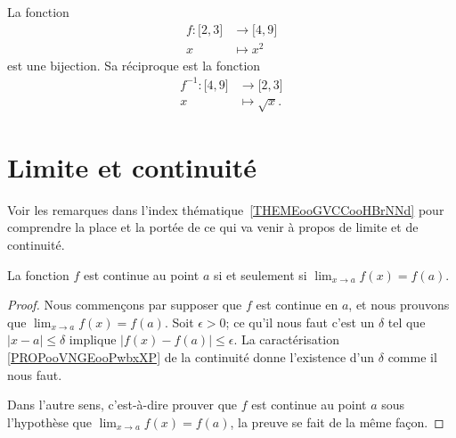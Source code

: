 \begin{example}
	La fonction
	\begin{equation}
		\begin{aligned}
			f\colon \mathopen[ 2 , 3 \mathclose] & \to \mathopen[ 4 , 9 \mathclose] \\
			x                                    & \mapsto x^2
		\end{aligned}
	\end{equation}
	est une bijection. Sa réciproque est la fonction
	\begin{equation}
		\begin{aligned}
			f^{-1}\colon \mathopen[ 4 , 9 \mathclose] & \to \mathopen[ 2 , 3 \mathclose] \\
			x                                         & \mapsto \sqrt{x}.
		\end{aligned}
	\end{equation}
\end{example}

\section{Limite et continuité}
\label{SecLimiteFontion}

Voir les remarques dans l'index thématique~\ref{THEMEooGVCCooHBrNNd} pour comprendre la place et la portée de ce qui va venir à propos de limite et de continuité.

\begin{theorem}           \label{ThoLimCont}
	La fonction \( f\) est continue au point \( a\) si et seulement si \( \lim_{x\to a}f(x)=f(a)\).
\end{theorem}

\begin{proof}
	Nous commençons par supposer que \( f\) est continue en \( a\), et nous prouvons que \( \lim_{x\to a}f(x)=f(a)\). Soit \( \epsilon>0\); ce qu'il nous faut c'est un \( \delta\) tel que \( | x-a |\leq\delta\) implique \( | f(x)-f(a) |\leq\epsilon\). La caractérisation \ref{PROPooVNGEooPwbxXP} de la continuité donne l'existence d'un \( \delta\) comme il nous faut.

	Dans l'autre sens, c'est-à-dire prouver que \( f\) est continue au point \( a\) sous l'hypothèse que \( \lim_{x\to a}f(x)=f(a)\), la preuve se fait de la même façon.
\end{proof}

